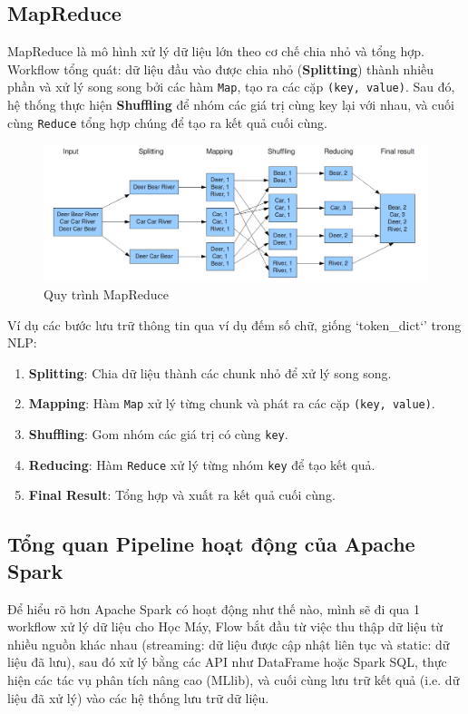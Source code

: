 \documentclass[11pt]{article}
\begin{document}
\subsection{MapReduce}
MapReduce là mô hình xử lý dữ liệu lớn theo cơ chế chia nhỏ và tổng hợp. Workflow tổng quát: dữ liệu đầu vào được chia nhỏ (\textbf{Splitting}) thành nhiều phần và xử lý song song bởi các hàm \texttt{Map}, tạo ra các cặp \texttt{(key, value)}. Sau đó, hệ thống thực hiện \textbf{Shuffling} để nhóm các giá trị cùng key lại với nhau, và cuối cùng \texttt{Reduce} tổng hợp chúng để tạo ra kết quả cuối cùng.
\begin{figure}[H]
    \centering
    \includegraphics[width=0.9\linewidth]{images/mapReduce.png}
    \caption{Quy trình MapReduce}
    \label{fig:mapreduce-flow}
\end{figure}

\noindent Ví dụ các bước lưu trữ thông tin qua ví dụ đếm số chữ, giống `token\_dict`' trong NLP:
\begin{enumerate}
    \item \textbf{Splitting}: Chia dữ liệu thành các chunk nhỏ để xử lý song song.
    \item \textbf{Mapping}: Hàm \texttt{Map} xử lý từng chunk và phát ra các cặp \texttt{(key, value)}.
    \item \textbf{Shuffling}: Gom nhóm các giá trị có cùng \texttt{key}.
    \item \textbf{Reducing}: Hàm \texttt{Reduce} xử lý từng nhóm \texttt{key} để tạo kết quả.
    \item \textbf{Final Result}: Tổng hợp và xuất ra kết quả cuối cùng.
\end{enumerate}



\subsection{Tổng quan Pipeline hoạt động của Apache Spark}
Để hiểu rõ hơn Apache Spark có hoạt động như thế nào, mình sẽ đi qua 1 workflow xử lý dữ liệu cho Học Máy,
Flow bắt đầu từ việc thu thập dữ liệu từ nhiều nguồn khác nhau (streaming: dữ liệu được cập nhật liên tục và static: dữ liệu đã lưu),
sau đó xử lý bằng các API như DataFrame hoặc Spark SQL, thực hiện các tác vụ phân tích nâng cao (MLlib),
và cuối cùng lưu trữ kết quả (i.e. dữ liệu đã xử lý) vào các hệ thống lưu trữ dữ liệu.
\end{document}
